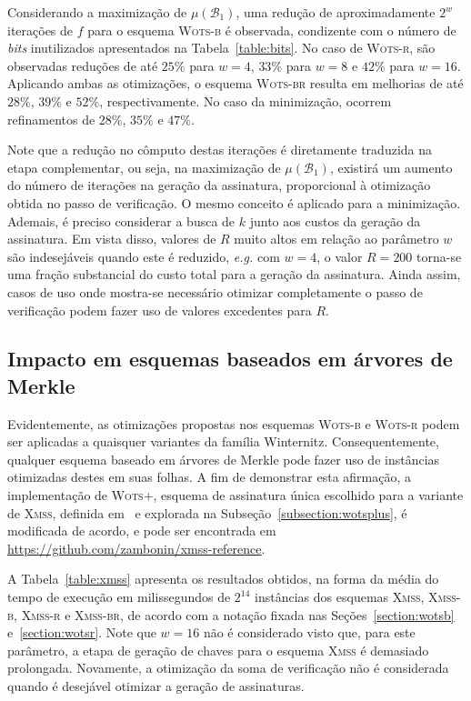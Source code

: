 \documentclass{ufsctex/ufsctex}
\newcommand{\bone}{\mathcal{B}_{1}}
\newcommand{\wotsplus}{\textsc{Wots+}}
\newcommand{\wotsb}{\textsc{Wots-b}}
\newcommand{\wotsr}{\textsc{Wots-r}}
\newcommand{\wotsbr}{\textsc{Wots-br}}
\newcommand{\xmss}{\textsc{Xmss}}
\newcommand{\xmssb}{\textsc{Xmss-b}}
\newcommand{\xmssr}{\textsc{Xmss-r}}
\newcommand{\xmssbr}{\textsc{Xmss-br}}
\begin{document}
Considerando a maximização de $\mu(\bone{})$, uma redução de aproximadamente
$2^{w}$ iterações de $f$ para o esquema \wotsb{} é observada, condizente com o
número de \emph{bits} inutilizados apresentados na Tabela~\ref{table:bits}. No
caso de \wotsr{}, são observadas reduções de até $25\%$ para $w = 4$, $33\%$
para $w = 8$ e $42\%$ para $w = 16$. Aplicando ambas as otimizações, o esquema
\wotsbr{} resulta em melhorias de até $28\%$, $39\%$ e $52\%$, respectivamente.
No caso da minimização, ocorrem refinamentos de $28\%$, $35\%$ e $47\%$.

Note que a redução no cômputo destas iterações é diretamente traduzida na etapa
complementar, ou seja, na maximização de $\mu(\bone{})$, existirá um aumento do
número de iterações na geração da assinatura, proporcional à otimização obtida
no passo de verificação. O mesmo conceito é aplicado para a minimização.
Ademais, é preciso considerar a busca de $k$ junto aos custos da
geração da assinatura. Em vista disso, valores de $R$ muito altos em relação ao
parâmetro $w$ são indesejáveis quando este é reduzido, \emph{e.g.} com $w = 4$,
o valor $R = 200$ torna-se uma fração substancial do custo total para a geração
da assinatura. Ainda assim, casos de uso onde mostra-se necessário otimizar
completamente o passo de verificação podem fazer uso de valores excedentes para
$R$.

\subsection{Impacto em esquemas baseados
  em árvores de Merkle}\label{subsection:impact}

Evidentemente, as otimizações propostas nos esquemas \wotsb{} e \wotsr{} podem
ser aplicadas a quaisquer variantes da família Winternitz. Consequentemente,
qualquer esquema baseado em árvores de Merkle pode fazer uso de instâncias
otimizadas destes em suas folhas. A fim de demonstrar esta afirmação, a
implementação de \wotsplus{}, esquema de assinatura única escolhido para a
variante de \xmss{}, definida em~\cite[Seção 3.1]{Huelsing:report:2018:may} e
explorada na Subseção~\ref{subsection:wotsplus}, é modificada de acordo, e pode
ser encontrada em \url{https://github.com/zambonin/xmss-reference}.

A Tabela~\ref{table:xmss} apresenta os resultados obtidos, na forma da média do
tempo de execução em milissegundos de $2^{14}$ instâncias dos esquemas \xmss{},
\xmssb{}, \xmssr{} e \xmssbr{}, de acordo com a notação fixada nas
Seções~\ref{section:wotsb} e~\ref{section:wotsr}. Note que $w = 16$ não é
considerado visto que, para este parâmetro, a etapa de geração de chaves para o
esquema \xmss{} é demasiado prolongada. Novamente, a otimização da soma de
verificação não é considerada quando é desejável otimizar a geração de
assinaturas.
\end{document}
